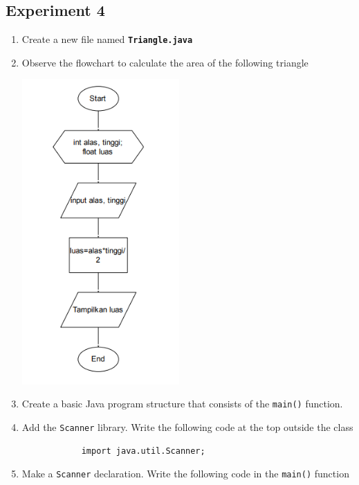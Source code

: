 \documentclass[12pt,titlepage]{article}
\begin{document}
\pagebreak
\subsection{Experiment 4}

\begin{enumerate}
    \item Create a new file named \texttt{\textbf{Triangle.java}}
    \item {
        Observe the flowchart to calculate the area of the following triangle

        \begin{center}
            \includegraphics[width=6cm]{./images/flowchart.png}
        \end{center}
    }
    \item Create a basic Java program structure that consists of the \texttt{main()} function.
    \item {
        Add the \texttt{Scanner} library. Write the following code at the top outside the class
        \begin{verbatim}
            import java.util.Scanner;
        \end{verbatim}
    }
    \item {
        Make a \texttt{Scanner} declaration. Write the following code in the \texttt{main()} function
        \begin{verbatim}

\end{verbatim}}
\end{enumerate}
\end{document}
